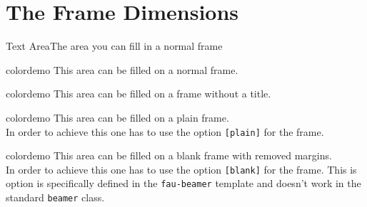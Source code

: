\section{The Frame Dimensions}
%
%
%
%
\begin{frame}[t]{Text Area}{The area you can fill in a normal frame}

\begin{beamercolorbox}[dp=0pt,sep=5em,wd=\textwidth,ht=\FrameHeight,center]{colordemo}%
This area can be filled on a normal frame.
\end{beamercolorbox}%
\end{frame}
%
%
%
\begin{frame}

\begin{beamercolorbox}[dp=0pt,sep=5em,
					   wd=\textwidth,
					   ht=\dimexpr\FrameHeight+\TitleHeight+4mm,center]{colordemo}%
This area can be filled on a frame without a title.
\end{beamercolorbox}%
\end{frame}
%
%
%
%
%
\begin{frame}[plain]
\begin{beamercolorbox}[dp=0pt,sep=5em,wd=\textwidth,ht=\paperheight,center]{colordemo}%
This area can be filled on a plain frame.\\
In order to achieve this one has to use the option \texttt{[plain]} for the frame.
\end{beamercolorbox}%
\end{frame}
%
%
%
%
%
\begin{frame}[blank]
\begin{beamercolorbox}[dp=0pt,sep=5em,wd=\textwidth,ht=\paperheight,center]{colordemo}%
This area can be filled on a blank frame with removed margins.\\
In order to achieve this one has to use the option \texttt{[blank]} for the frame. This is option 
is specifically defined in the \texttt{fau-beamer} template and doesn't work in the standard 
\texttt{beamer} class.
\end{beamercolorbox}%
\end{frame}
%
%
%
%
%
